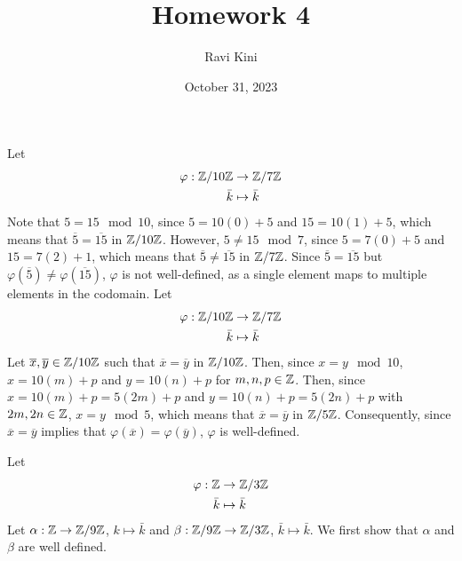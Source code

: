 \documentclass{article}
\title{Homework 4}
\author{Ravi Kini}
\date{October 31, 2023}
\begin{document}
\maketitle

\problem
{}
Let
\begin{equation}
    \begin{split}
        \varphi: \mathbb{Z}/10\mathbb{Z} & \to \mathbb{Z}/7\mathbb{Z} \\
            \bar k &  \mapsto \bar k
    \end{split}
\end{equation}
Note that $5 = 15 \mod 10$, since $5 = 10\left(0\right) + 5$ and $15 = 10\left(1\right) + 5$, which means that $\overline{5} = \overline{15}$ in $\mathbb{Z}/10\mathbb{Z}$. However, $5 \neq 15 \mod 7$, since $5 = 7\left(0\right) + 5$ and $15 = 7\left(2\right) + 1$, which means that $\overline{5} \neq \overline{15}$ in $\mathbb{Z}/7\mathbb{Z}$. Since $\overline{5} = \overline{15}$ but $\varphi\left(\overline{5}\right) \neq \varphi\left(\overline{15}\right)$, $\varphi$ is not well-defined, as a single element maps to multiple elements in the codomain. 
Let
\begin{equation}
    \begin{split}
        \varphi: \mathbb{Z}/10\mathbb{Z} & \to \mathbb{Z}/7\mathbb{Z} \\
            \bar k &  \mapsto \bar k
    \end{split}
\end{equation}
Let $\overline{x}, \overline{y} \in \mathbb{Z}/10\mathbb{Z}$ such that $\overline{x} = \overline{y}$ in $\mathbb{Z}/10\mathbb{Z}$. Then, since $x = y \mod 10$, $x = 10\left(m\right) + p$ and $y = 10\left(n\right) + p$ for $m, n, p \in \mathbb{Z}$. Then, since $x = 10\left(m\right) + p = 5\left(2m\right) + p$ and $y = 10\left(n\right) + p = 5\left(2n\right) + p$ with $2m, 2n \in \mathbb{Z}$, $x = y \mod 5$, which means that $\overline{x} = \overline{y}$ in $\mathbb{Z}/5\mathbb{Z}$. Consequently, since $\overline{x} = \overline{y}$ implies that $\varphi\left(\overline{x}\right) = \varphi\left(\overline{y}\right)$, $\varphi$ is well-defined.

\clearpage

\problem
{}
Let
\begin{equation}
    \begin{split}
        \varphi: \mathbb{Z} & \to \mathbb{Z}/3\mathbb{Z} \\
            \bar k &  \mapsto \bar k
    \end{split}
\end{equation}
Let $\alpha: \mathbb{Z} \to \mathbb{Z}/9\mathbb{Z}$, $k \mapsto \bar k$ and $\beta: \mathbb{Z}/9\mathbb{Z} \to \mathbb{Z}/3\mathbb{Z}$, $\bar k \mapsto \bar k$. We first show that $\alpha$ and $\beta$ are well defined.
\end{document}
